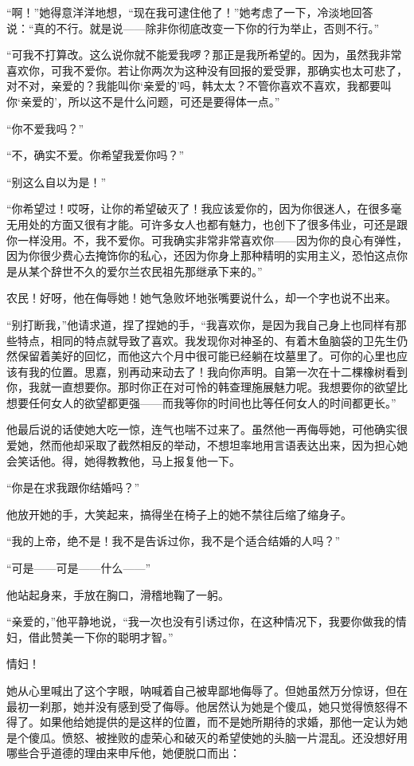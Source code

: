 \par “啊！”她得意洋洋地想，“现在我可逮住他了！”她考虑了一下，冷淡地回答说：“真的不行。就是说——除非你彻底改变一下你的行为举止，否则不行。”
\par “可我不打算改。这么说你就不能爱我啰？那正是我所希望的。因为，虽然我非常喜欢你，可我不爱你。若让你两次为这种没有回报的爱受罪，那确实也太可悲了，对不对，亲爱的？我能叫你‘亲爱的’吗，韩太太？不管你喜欢不喜欢，我都要叫你‘亲爱的’，所以这不是什么问题，可还是要得体一点。”
\par “你不爱我吗？”
\par “不，确实不爱。你希望我爱你吗？”
\par “别这么自以为是！”
\par “你希望过！哎呀，让你的希望破灭了！我应该爱你的，因为你很迷人，在很多毫无用处的方面又很有才能。可许多女人也都有魅力，也创下了很多伟业，可还是跟你一样没用。不，我不爱你。可我确实非常非常喜欢你——因为你的良心有弹性，因为你很少费心去掩饰你的私心，还因为你身上那种精明的实用主义，恐怕这点你是从某个辞世不久的爱尔兰农民祖先那继承下来的。”
\par 农民！好呀，他在侮辱她！她气急败坏地张嘴要说什么，却一个字也说不出来。
\par “别打断我，”他请求道，捏了捏她的手，“我喜欢你，是因为我自己身上也同样有那些特点，相同的特点就导致了喜欢。我发现你对神圣的、有着木鱼脑袋的卫先生仍然保留着美好的回忆，而他这六个月中很可能已经躺在坟墓里了。可你的心里也应该有我的位置。思嘉，别再动来动去了！我向你声明。自第一次在十二棵橡树看到你，我就一直想要你。那时你正在对可怜的韩查理施展魅力呢。我想要你的欲望比想要任何女人的欲望都更强——而我等你的时间也比等任何女人的时间都更长。”
\par 他最后说的话使她大吃一惊，连气也喘不过来了。虽然他一再侮辱她，可他确实很爱她，然而他却采取了截然相反的举动，不想坦率地用言语表达出来，因为担心她会笑话他。得，她得教教他，马上报复他一下。
\par “你是在求我跟你结婚吗？”
\par 他放开她的手，大笑起来，搞得坐在椅子上的她不禁往后缩了缩身子。
\par “我的上帝，绝不是！我不是告诉过你，我不是个适合结婚的人吗？”
\par “可是——可是——什么——”
\par 他站起身来，手放在胸口，滑稽地鞠了一躬。
\par “亲爱的，”他平静地说，“我一次也没有引诱过你，在这种情况下，我要你做我的情妇，借此赞美一下你的聪明才智。”
\par 情妇！
\par 她从心里喊出了这个字眼，呐喊着自己被卑鄙地侮辱了。但她虽然万分惊讶，但在最初一刹那，她并没有感到受了侮辱。他居然认为她是个傻瓜，她只觉得愤怒得不得了。如果他给她提供的是这样的位置，而不是她所期待的求婚，那他一定认为她是个傻瓜。愤怒、被挫败的虚荣心和破灭的希望使她的头脑一片混乱。还没想好用哪些合乎道德的理由来申斥他，她便脱口而出：
